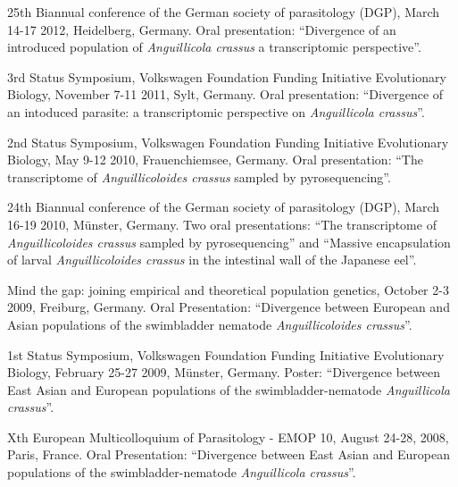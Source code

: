 \documentclass[10pt,A4paper]{article}
\renewenvironment{itemize}{
  \begin{list}{}{
    \setlength{\leftmargin}{1.5em}
    \setlength{\itemsep}{0.25em}
    \setlength{\parskip}{0pt}
    \setlength{\parsep}{0.25em}
  }
}{
  \end{list}
}
\begin{document}
\begin{itemize}

\item 25th Biannual conference of the German society of parasitology
  (DGP), March 14-17 2012, Heidelberg, Germany. Oral presentation:
  ``Divergence of an introduced population of \textit{Anguillicola
    crassus} a transcriptomic perspective''.

\item 3rd Status Symposium, Volkswagen Foundation Funding Initiative
  Evolutionary Biology, November 7-11 2011, Sylt, Germany. Oral
  presentation: ``Divergence of an intoduced parasite: a
  transcriptomic perspective on \textit{Anguillicola crassus}''.

\item 2nd Status Symposium, Volkswagen Foundation Funding Initiative
  Evolutionary Biology, May 9-12 2010, Frauenchiemsee, Germany. Oral
  presentation: ``The transcriptome of \textit{Anguillicoloides
    crassus} sampled by pyrosequencing''.

\item 24th Biannual conference of the German society of parasitology
  (DGP), March 16-19 2010, M\"unster, Germany. Two oral presentations:
  ``The transcriptome of \textit{Anguillicoloides crassus} sampled by
  pyrosequencing'' and ``Massive encapsulation of larval
  \textit{Anguillicoloides crassus} in the intestinal wall of the
  Japanese eel''.

\item Mind the gap: joining empirical and theoretical population
  genetics, October 2-3 2009, Freiburg, Germany. Oral Presentation:
  ``Divergence between European and Asian populations of the
  swimbladder nematode \textit{Anguillicoloides crassus}''.

\item 1st Status Symposium, Volkswagen Foundation Funding Initiative
  Evolutionary Biology, February 25-27 2009, M\"unster,
  Germany. Poster: ``Divergence between East Asian and European
  populations of the swimbladder-nematode \textit{Anguillicola
    crassus}''.

\item Xth European Multicolloquium of Parasitology - EMOP 10, August
  24-28, 2008, Paris, France. Oral Presentation: ``Divergence between
  East Asian and European populations of the swimbladder-nematode
  \textit{Anguillicola crassus}''.

\end{itemize}
\end{document}
